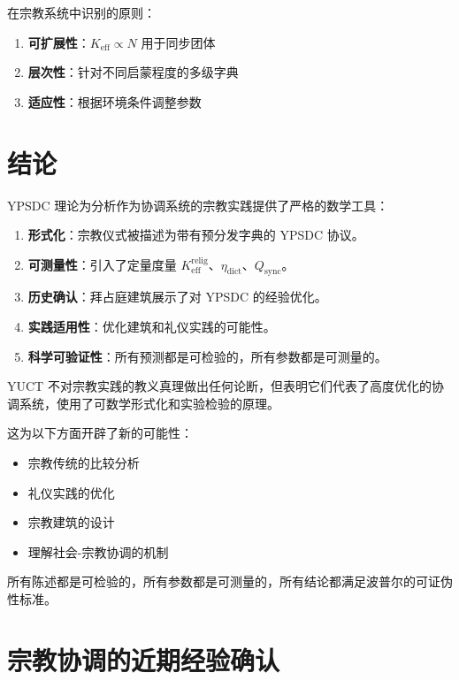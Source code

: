 \documentclass[12pt,a4paper]{article}
\begin{document}
	在宗教系统中识别的原则：
	\begin{enumerate}
		\item \textbf{可扩展性}：$K_{\mathrm{eff}} \propto N$ 用于同步团体
		\item \textbf{层次性}：针对不同启蒙程度的多级字典
		\item \textbf{适应性}：根据环境条件调整参数
	\end{enumerate}
	
	\section{结论}
	
	YPSDC 理论为分析作为协调系统的宗教实践提供了严格的数学工具：
	
	\begin{enumerate}
		\item \textbf{形式化}：宗教仪式被描述为带有预分发字典的 YPSDC 协议。
		\item \textbf{可测量性}：引入了定量度量 $K_{\mathrm{eff}}^{\mathrm{relig}}$、$\eta_{\mathrm{dict}}$、$Q_{\mathrm{sync}}$。
		\item \textbf{历史确认}：拜占庭建筑展示了对 YPSDC 的经验优化。
		\item \textbf{实践适用性}：优化建筑和礼仪实践的可能性。
		\item \textbf{科学可验证性}：所有预测都是可检验的，所有参数都是可测量的。
	\end{enumerate}
	
	YUCT 不对宗教实践的教义真理做出任何论断，但表明它们代表了高度优化的协调系统，使用了可数学形式化和实验检验的原理。
	
	这为以下方面开辟了新的可能性：
	\begin{itemize}
		\item 宗教传统的比较分析
		\item 礼仪实践的优化
		\item 宗教建筑的设计
		\item 理解社会-宗教协调的机制
	\end{itemize}
	
	所有陈述都是可检验的，所有参数都是可测量的，所有结论都满足波普尔的可证伪性标准。
	
	\section{宗教协调的近期经验确认}
	\label{sec:recent-studies}
	
\end{document}

